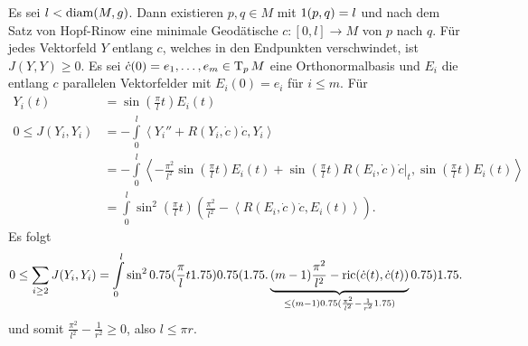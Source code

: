 \begin{bew}
  Es sei $l < \operatorname{diam}(M,g)$.
  Dann existieren $p,q \in M$ mit $1(p,q) = l$ und nach dem Satz von Hopf-Rinow eine minimale Geodätische $c\colon[0,l] \to M$ von $p$ nach $q$.
  Für jedes Vektorfeld $Y$ entlang $c$, welches in den Endpunkten verschwindet, ist $J(Y,Y) \geq 0$.
  Es sei $\dot c(0) = e_1, \ldots, e_m \in \operatorname{T}_pM$ eine Orthonormalbasis und $E_i$ die entlang $c$ parallelen Vektorfelder mit $E_i(0) = e_i$ für $i \leq m$.
  Für 
  \begin{align*}
    Y_i(t) & = \sin \left(\frac{\pi}{l}t \right) E_i(t)\\
    0  \leq J(Y_i,Y_i) &= -\int\limits_0^l\left<Y_i''+R(Y_i,\dot c)\dot c,Y_i\right>\\
    & = -\int\limits_0^l\left<-\frac{\pi^2}{l^2}\sin\left(\frac{\pi}{l}t\right)E_i(t) + \sin\left(\frac{\pi}{l}t\right)R(E_i,\dot c)\dot c|_t,\sin\left(\frac{\pi}{l}t\right)E_i(t)\right>\\
    & = \int\limits_0^l \sin^2\left(\frac{\pi}{l}t\right)\left(\frac{\pi^2}{l^2}-\left<R(E_i,\dot c)\dot c,E_i(t)\right>\right).
  \end{align*}
  Es folgt
  \begin{align*}
    0 \leq \sum_{i \geq 2}J(Y_i,Y_i) = \int\limits_0^l\sin^2\left(\frac{\pi}{l}t\right)\Big(\underbrace{(m-1)\frac{\pi^2}{l^2} - \ric(\dot c(t),\dot c(t))}_{\leq (m-1)\left(\frac{\pi^2}{l^2}-\frac{1}{r^2}\right)}\Big)
  \end{align*}
  und somit $\frac{\pi^2}{l^2} - \frac{1}{r^2} \geq 0$, also $l \leq \pi r$.
\end{bew}

